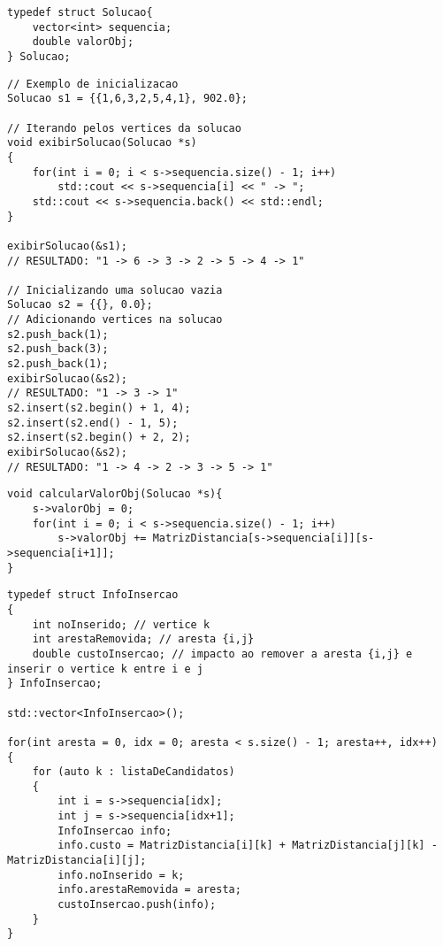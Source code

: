 \begin{lstlisting}[label=exemploStructSolucao, caption=Representação das soluções, style=cplusplusListStyle]
typedef struct Solucao{
    vector<int> sequencia;
    double valorObj;
} Solucao;

\end{lstlisting}

\begin{lstlisting}[label=exemploInicializacaoInsercao, caption=Inicialização de soluções e inserção de vértices, style=cplusplusListStyle] 
// Exemplo de inicializacao 
Solucao s1 = {{1,6,3,2,5,4,1}, 902.0};

// Iterando pelos vertices da solucao 
void exibirSolucao(Solucao *s)
{
    for(int i = 0; i < s->sequencia.size() - 1; i++)
        std::cout << s->sequencia[i] << " -> ";
    std::cout << s->sequencia.back() << std::endl;
}

exibirSolucao(&s1);
// RESULTADO: "1 -> 6 -> 3 -> 2 -> 5 -> 4 -> 1" 

// Inicializando uma solucao vazia 
Solucao s2 = {{}, 0.0};
// Adicionando vertices na solucao 
s2.push_back(1);
s2.push_back(3);
s2.push_back(1);
exibirSolucao(&s2);
// RESULTADO: "1 -> 3 -> 1"
s2.insert(s2.begin() + 1, 4);
s2.insert(s2.end() - 1, 5);
s2.insert(s2.begin() + 2, 2);
exibirSolucao(&s2);
// RESULTADO: "1 -> 4 -> 2 -> 3 -> 5 -> 1"
\end{lstlisting}


\begin{lstlisting}[label=exemploCalculoValorObj, caption=Cálculo do valor objetivo, style=cplusplusListStyle]
void calcularValorObj(Solucao *s){
    s->valorObj = 0;
    for(int i = 0; i < s->sequencia.size() - 1; i++)
        s->valorObj += MatrizDistancia[s->sequencia[i]][s->sequencia[i+1]];
}
\end{lstlisting}





\begin{lstlisting}[style=cplusplusListStyle, caption=Cálculo de custo de inserção., label=exemploCalculoCustoInsercao]
typedef struct InfoInsercao
{
    int noInserido; // vertice k
    int arestaRemovida; // aresta {i,j}
    double custoInsercao; // impacto ao remover a aresta {i,j} e inserir o vertice k entre i e j
} InfoInsercao;
    
std::vector<InfoInsercao>();

for(int aresta = 0, idx = 0; aresta < s.size() - 1; aresta++, idx++)
{
    for (auto k : listaDeCandidatos)
    {
        int i = s->sequencia[idx];
        int j = s->sequencia[idx+1];
        InfoInsercao info;
        info.custo = MatrizDistancia[i][k] + MatrizDistancia[j][k] - MatrizDistancia[i][j];
        info.noInserido = k;
        info.arestaRemovida = aresta;
        custoInsercao.push(info);
    }
}
\end{lstlisting}

